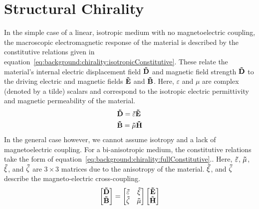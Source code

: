 \section{Structural Chirality}\label{sec:background:Chirality:Structural}
In the simple case of a linear, isotropic medium with no magnetoelectric coupling, the macroscopic electromagnetic response of the material is described by the constitutive relations given in equation~\ref{eq:background:chirality:isotropicConstitutive}. These relate the material's internal electric displacement field $\bf{\tilde D}$ and magnetic field strength $\bf{\tilde D}$ to the driving electric and magnetic fields $\bf{\tilde E}$ and $\bf{\tilde B}$. Here, $\varepsilon$ and $\mu$ are complex (denoted by a tilde) scalars and correspond to the isotropic electric permittivity and magnetic permeability of the material.
\begin{equation}\label{eq:background:chirality:isotropicConstitutive}
	\begin{split}
        & \bf{\tilde D} = \tilde \varepsilon \bf{\tilde E} \\
        & \bf{\tilde B} = \tilde \mu \bf{\tilde H}
	\end{split}
\end{equation}
In the general case however, we cannot assume isotropy and a lack of magnetoelectric coupling. For a bi-anisotropic medium, the constitutive relations take the form of equation~\ref{eq:background:chirality:fullConstitutive}.\cite{Ishimaru2003, Capolino2009}. Here, $\bf{\tilde \varepsilon}$, $\bf{\tilde \mu}$, $\bf{\tilde \xi}$, and $\bf{\tilde \zeta}$ are $3 \times 3$ matrices due to the anisotropy of the material. $\bf{\tilde \xi}$, and $\bf{\tilde \zeta}$ describe the magneto-electric cross-coupling.
\begin{equation}\label{eq:background:chirality:fullConstitutive}
    \begin{bmatrix}
        \bf{\tilde D} \\
        \bf{\tilde B}
    \end{bmatrix}
    =
    \begin{bmatrix}
        \bf{\tilde \varepsilon} & \bf{\tilde \xi} \\
        \bf{\tilde \zeta} & \bf{\tilde \mu}
    \end{bmatrix}
    \begin{bmatrix}
        \bf{\tilde E} \\
        \bf{\tilde H}
    \end{bmatrix}
\end{equation}
